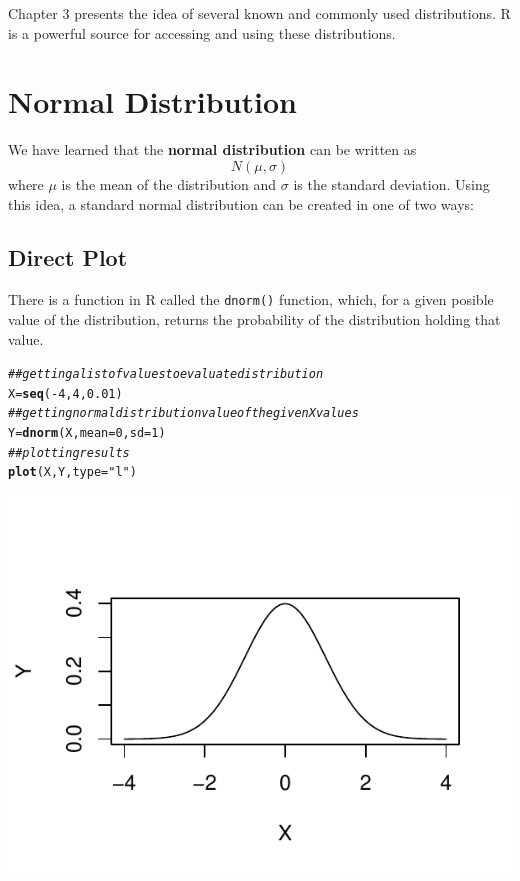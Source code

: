 \documentclass{report}\usepackage[]{graphicx}\usepackage[]{color}
\makeatletter
\def\maxwidth{ %
  \ifdim\Gin@nat@width>\linewidth
    \linewidth
  \else
    \Gin@nat@width
  \fi
}
\newcommand{\hlnum}[1]{\textcolor[rgb]{0.686,0.059,0.569}{#1}}%
\newcommand{\hlstr}[1]{\textcolor[rgb]{0.192,0.494,0.8}{#1}}%
\newcommand{\hlcom}[1]{\textcolor[rgb]{0.678,0.584,0.686}{\textit{#1}}}%
\newcommand{\hlopt}[1]{\textcolor[rgb]{0,0,0}{#1}}%
\newcommand{\hlstd}[1]{\textcolor[rgb]{0.345,0.345,0.345}{#1}}%
\newcommand{\hlkwb}[1]{\textcolor[rgb]{0.69,0.353,0.396}{#1}}%
\newcommand{\hlkwc}[1]{\textcolor[rgb]{0.333,0.667,0.333}{#1}}%
\newcommand{\hlkwd}[1]{\textcolor[rgb]{0.737,0.353,0.396}{\textbf{#1}}}%
\newenvironment{kframe}{%
 \def\at@end@of@kframe{}%
 \ifinner\ifhmode%
  \def\at@end@of@kframe{\end{minipage}}%
  \begin{minipage}{\columnwidth}%
 \fi\fi%
 \def\FrameCommand##1{\hskip\@totalleftmargin \hskip-\fboxsep
 \colorbox{shadecolor}{##1}\hskip-\fboxsep
     \hskip-\linewidth \hskip-\@totalleftmargin \hskip\columnwidth}%
 \MakeFramed {\advance\hsize-\width
   \@totalleftmargin\z@ \linewidth\hsize
   \@setminipage}}%
 {\par\unskip\endMakeFramed%
 \at@end@of@kframe}
\newenvironment{knitrout}{}{} %
\makeatother
\begin{document}
\vspace{0.5cm} 

Chapter 3 presents the idea of several known and commonly used distributions.  R is a powerful source for accessing and using these distributions.

\section{Normal Distribution}
We have learned that the \textbf{normal distribution} can be written as 
\[ N(\mu, \sigma) \]
where $\mu$ is the mean of the distribution and $\sigma$ is the standard deviation.  Using this idea, a standard normal distribution can be created in one of two ways: 

\subsection{Direct Plot}
There is a function in R called the \texttt{dnorm()} function, which, for a given posible value of the distribution, returns the probability of the distribution holding that value.  
\begin{knitrout}
\color{fgcolor}\begin{kframe}
\begin{alltt}
\hlcom{## getting a list of values to evaluate distribution}
\hlstd{X} \hlkwb{=} \hlkwd{seq}\hlstd{(}\hlopt{-}\hlnum{4}\hlstd{,} \hlnum{4}\hlstd{,} \hlnum{0.01}\hlstd{)}
\hlcom{## getting normal distribution value of the given X values }
\hlstd{Y} \hlkwb{=} \hlkwd{dnorm}\hlstd{(X,} \hlkwc{mean} \hlstd{=} \hlnum{0}\hlstd{,} \hlkwc{sd} \hlstd{=} \hlnum{1}\hlstd{)}
\hlcom{## plotting results }
\hlkwd{plot}\hlstd{(X,Y,} \hlkwc{type} \hlstd{=} \hlstr{"l"}\hlstd{)}
\end{alltt}
\end{kframe}

{\centering \includegraphics[width=\maxwidth]{figure/unnamed-chunk-82-1} 

}



\end{knitrout}
\end{document}
